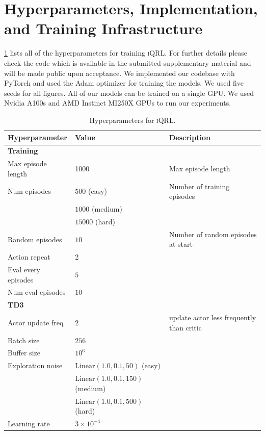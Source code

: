 \documentclass{article}
\theoremstyle{plain}
\theoremstyle{definition}
\theoremstyle{remark}
\newcommand{\our}{\textsc{iQRL}\xspace}
\begin{document}
\section{Hyperparameters, Implementation, and Training Infrastructure}
\cref{tab:hyperparameters} lists all of the hyperparameters for training \our. For further details please check the code which is available in the submitted supplementary material and will be made public upon acceptance. We implemented our codebase with PyTorch and used the Adam optimizer for training the models. We used five seeds for all figures. All of our models can be trained on a single GPU. We used Nvidia A100s and AMD Instinct MI250X GPUs to run our experiments.

\begin{table}[h]
\caption{Hyperparameters for \our.}
\label{tab:hyperparameters}
\vskip 0.15in
\begin{center}
\begin{small}
\begin{sc}
\begin{tabular}{lll}
\toprule
Hyperparameter & Value & Description \\
\midrule
\textbf{Training} & & \\
Max episode length & 1000 &  Max episode length \\
Num episodes & $500$ (easy) & Number of training episodes \\
             & $1000$ (medium) & \\
             & $15000$ (hard) & \\
Random episodes & $10$ & Number of random episodes at start \\
Action repeat & 2 & \\
Eval every episodes & $5$ & \\
Num eval episodes & $10$ & \\
\hline
\textbf{TD3} & & \\
Actor update freq & $2$  & update actor less frequently than critic \\
Batch size & $256$ & \\
Buffer size & $10^{6}$ & \\
Exploration noise & $\mathrm{Linear}(1.0,0.1,50)$ (easy) & \\
                  & $\mathrm{Linear}(1.0,0.1,150)$ (medium) & \\
                  & $\mathrm{Linear}(1.0,0.1,500)$ (hard) & \\
Learning rate & $3 \times 10^{-4}$ & \\

\end{tabular}
\end{sc}
\end{small}
\end{center}
\end{table}
\end{document}
